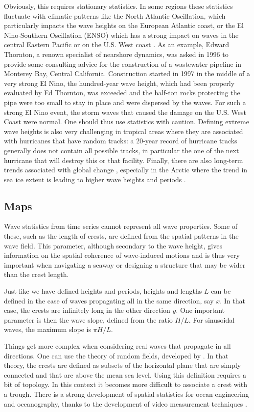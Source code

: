 Obviously, this requires stationary statistics. In some regions 
these statistics fluctuate with climatic patterns like the North Atlantic Oscillation, which particularly impacts
the wave heights on the European Atlantic coast, or the El Nino-Southern Oscillation  (ENSO) which has a strong 
impact on waves in the central Eastern Pacific or on the U.S. West coast \citep{Bromirski&al.2005}. 
As an example, Edward Thornton, a renown specialist of nearshore dynamics, was asked in 1996 to provide 
some consulting advice for the construction of a wastewater pipeline in Monterey Bay, Central California. 
Construction started in 1997 in the middle of a very strong El Nino, 
the hundred-year wave height, which had been properly evaluated by Ed Thornton, was exceeded 
and the half-ton rocks protecting the pipe were too small to stay in place and were dispersed by the waves. 
For such a strong El Nino event, the storm waves that caused the damage on the U.S. West Coast were normal. 
One should thus use statistics with caution. Defining extreme wave heights is also very challenging in tropical areas where
they are associated with hurricanes that have random tracks: a 20-year record of hurricane tracks generally does not contain 
all possible tracks, in particular the one of the next hurricane that will destroy this or that facility. 
Finally, there are also long-term trends associated with global change \citep[e.g.][]{Wang&Swail2002,Charles&al.2012}, 
especially in the Arctic where the trend in sea ice extent  is leading to higher wave heights and periods \citep{Stopa&al.2016b}. 

\subsection{Maps}
Wave statistics from time series cannot represent all wave properties. Some of these, such as the 
length of crests, are defined from the spatial 
patterns in the wave field. This parameter, although secondary to the wave height, gives information 
on the spatial coherence of wave-induced motions and is thus very important when navigating a seaway or designing 
a structure that may be wider than the crest length.
 
Just like we have defined heights and periods, heights and lengths $L$ can be defined 
in the case of waves propagating all in the same direction, say $x$. In that case, the crests are infinitely long in the other 
direction $y$. One important parameter is then the wave slope, defined from the ratio $H/L$. For sinusoidal waves, the maximum 
slope is $\pi H/ L$. 

Things get more complex when considering real waves that propagate in all directions. 
One can use the theory of random fields, developed by \cite{Adler1981}. In that theory, the crests are defined 
as subsets of the horizontal plane that are simply connected and that are above the mean sea level. Using this definition 
requires a bit of topology. In this context it becomes more difficult to associate a crest with a trough. 
There is a strong development of spatial statistics for ocean engineering and oceanography, thanks to the development 
of video measurement techniques \citep{Fedele&al.2009a}. 
